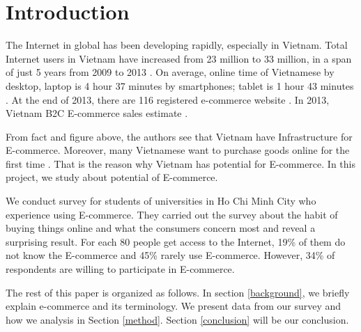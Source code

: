 \documentclass[conference]{IEEEtran}
\begin{document}
\section{Introduction} \label{intro}
The Internet in global has been developing rapidly, especially in Vietnam. Total Internet users in Vietnam have increased from 23 million to 33 million, in a span of just 5 years from 2009 to 2013 \cite{InfoAndData2014}. On average, online time of Vietnamese by desktop, laptop is 4 hour 37 minutes by smartphones; tablet is 1 hour 43 minutes \cite{VietnamMobile2014}. At the end of 2013, there are 116 registered e-commerce website \cite{VietnamMobile2013}. In 2013, Vietnam B2C E-commerce sales estimate \cite{vecita}.



From fact and figure above, the authors see that Vietnam have Infrastructure for E-commerce. Moreover, many Vietnamese want to purchase goods online for the first time \cite{GoogleStudy2013}. That is the reason why Vietnam has potential for E-commerce. In this project, we study about potential of E-commerce.

We conduct survey for students of universities in Ho Chi Minh City who experience using E-commerce. They carried out the survey about the habit of buying things online and what the consumers concern most and reveal a surprising result. For each 80 people get access to the Internet, 19\% of them do not know the E-commerce and 45\% rarely use E-commerce. However, 34\% of respondents are willing to participate in E-commerce.

The rest of this paper is organized as follows. In section \ref{background}, we briefly explain e-commerce and its terminology. We present data from our survey and how we analysis in Section \ref{method}. Section \ref{conclusion} will be our conclusion.




\end{document}
